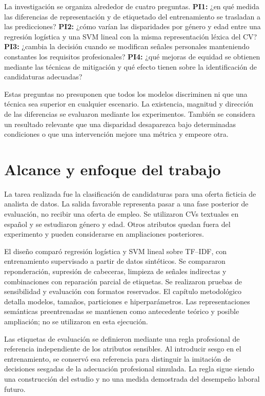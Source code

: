 \documentclass[11pt,a4paper,oneside]{report}
\begin{document}
La investigación se organiza alrededor de cuatro preguntas. \textbf{PI1:} ¿en qué medida las diferencias de representación y de etiquetado del entrenamiento se trasladan a las predicciones? \textbf{PI2:} ¿cómo varían las disparidades por género y edad entre una regresión logística y una SVM lineal con la misma representación léxica del CV? \textbf{PI3:} ¿cambia la decisión cuando se modifican señales personales manteniendo constantes los requisitos profesionales? \textbf{PI4:} ¿qué mejoras de equidad se obtienen mediante las técnicas de mitigación y qué efecto tienen sobre la identificación de candidaturas adecuadas?

Estas preguntas no presuponen que todos los modelos discriminen ni que una técnica sea superior en cualquier escenario. La existencia, magnitud y dirección de las diferencias se evaluaron mediante los experimentos. También se considera un resultado relevante que una disparidad desaparezca bajo determinadas condiciones o que una intervención mejore una métrica y empeore otra.

\section{Alcance y enfoque del trabajo}

La tarea realizada fue la clasificación de candidaturas para una oferta ficticia de analista de datos. La salida favorable representa pasar a una fase posterior de evaluación, no recibir una oferta de empleo. Se utilizaron CVs textuales en español y se estudiaron género y edad. Otros atributos quedan fuera del experimento y pueden considerarse en ampliaciones posteriores.

El diseño comparó regresión logística y SVM lineal sobre TF--IDF, con entrenamiento supervisado a partir de datos sintéticos. Se compararon reponderación, supresión de cabeceras, limpieza de señales indirectas y combinaciones con reparación parcial de etiquetas. Se realizaron pruebas de sensibilidad y evaluación con formatos reservados. El capítulo metodológico detalla modelos, tamaños, particiones e hiperparámetros. Las representaciones semánticas preentrenadas se mantienen como antecedente teórico y posible ampliación; no se utilizaron en esta ejecución.

Las etiquetas de evaluación se definieron mediante una regla profesional de referencia independiente de los atributos sensibles. Al introducir sesgo en el entrenamiento, se conservó esa referencia para distinguir la imitación de decisiones sesgadas de la adecuación profesional simulada. La regla sigue siendo una construcción del estudio y no una medida demostrada del desempeño laboral futuro.
\end{document}
